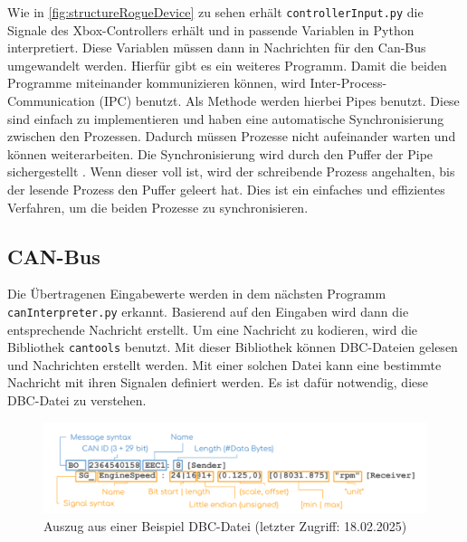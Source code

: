 Wie in \ref{fig:structureRogueDevice} zu sehen erhält \texttt{controllerInput.py} die Signale des Xbox-Controllers 
erhält und in passende Variablen in Python interpretiert. Diese Variablen müssen
dann in Nachrichten für den Can-Bus umgewandelt werden. Hierfür gibt es ein weiteres Programm. Damit die beiden Programme miteinander kommunizieren
können, wird Inter-Process-Communication (IPC) benutzt. Als Methode werden hierbei Pipes benutzt. Diese sind einfach zu implementieren und haben
eine automatische Synchronisierung zwischen den Prozessen. Dadurch müssen Prozesse nicht aufeinander warten und können weiterarbeiten. 
Die Synchronisierung wird durch den Puffer der Pipe sichergestellt \cite{Venkataraman2015}. 
Wenn dieser voll ist, wird der schreibende Prozess angehalten, bis der
lesende Prozess den Puffer geleert hat. Dies ist ein einfaches und effizientes Verfahren, 
um die beiden Prozesse zu synchronisieren. 

\subsection{CAN-Bus} \label{sec:canBus}
Die Übertragenen Eingabewerte werden in dem nächsten Programm \texttt{canInterpreter.py} erkannt. Basierend auf den
Eingaben wird dann die entsprechende Nachricht erstellt. Um eine Nachricht zu kodieren, wird die Bibliothek \texttt{cantools} benutzt.
Mit dieser Bibliothek können DBC-Dateien gelesen und Nachrichten erstellt werden. Mit einer solchen Datei kann eine
bestimmte Nachricht mit ihren Signalen definiert werden. Es ist dafür notwendig, diese DBC-Datei zu verstehen.
\begin{figure}[H]
    \centering
    \includegraphics[scale=0.2]{images/CAN-DBC-File-Format-Explained-Intro-Basics_2.png}
    \caption{Auszug aus einer Beispiel DBC-Datei \cite{cssElectronics}(letzter Zugriff: 18.02.2025)}
    \label{fig:dbcfile}
\end{figure}

